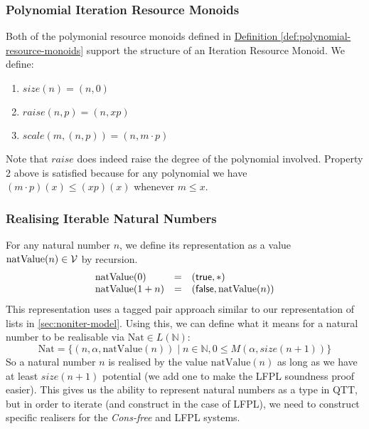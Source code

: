 \documentclass[acmsmall,review,screen,anonymous]{acmart}
\newcommand{\defref}[1]{\hyperref[#1]{Definition \ref*{#1}}}
\begin{document}
\subsubsection{Polynomial Iteration Resource Monoids}

Both of the polymonial resource monoids defined in
\defref{def:polynomial-resource-monoids} support the structure of an
Iteration Resource Monoid. We define:
\begin{enumerate}
\item $\mathit{size}(n) = (n, 0)$
\item $\mathit{raise}(n, p) = (n, xp)$
\item $\mathit{scale}(m, (n, p)) = (n, m \cdot p)$
\end{enumerate}
Note that $\mathit{raise}$ does indeed raise the degree of the
polynomial involved. Property 2 above is satisfied because for any
polynomial we have $(m \cdot p)(x) \leq (xp)(x)$ whenever $m \leq x$.

\subsubsection{Realising Iterable Natural Numbers}

For any natural number $n$, we define its representation as a value
$\mathrm{natValue}(n) \in \mathcal{V}$ by recursion.
\begin{displaymath}
  \begin{array}{lcl}
    \mathrm{natValue}(0) &=& (\mathsf{true} , *) \\
    \mathrm{natValue}(1 + n) &=& (\mathsf{false}, \mathrm{natValue}(n))
  \end{array}
\end{displaymath}
This representation uses a tagged pair approach similar to our
representation of lists in \autoref{sec:noniter-model}. Using this, we
can define what it means for a natural number to be realisable via
$\mathrm{Nat} \in L(\mathbb{N})$:
\begin{displaymath}
  \mathrm{Nat} = \{(n, \alpha, \mathrm{natValue}(n)) \mid n \in \mathbb{N}, 0 \leq M(\alpha, \mathit{size}(n+1)) \}
\end{displaymath}
So a natural number $n$ is realised by the value
$\mathrm{natValue}(n)$ as long as we have at least
$\mathit{size}(n+1)$ potential (we add one to make the LFPL soundness
proof easier).  This gives us the ability to represent natural numbers
as a type in QTT, but in order to iterate (and construct in the case
of LFPL), we need to construct specific realisers for the
\emph{Cons-free} and LFPL systems.
\end{document}
